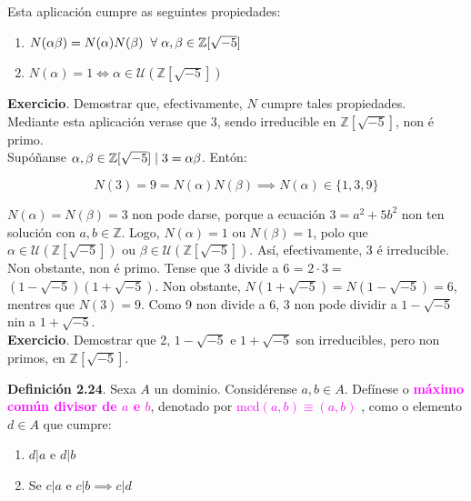 \documentclass[twoside]{report}
\newcommand{\magbf}[1]{\textcolor{magenta}{\textbf{#1}}} %
\newcommand{\magen}[1]{\textcolor{magenta}{#1}}
\theoremstyle{mystyle}
\begin{document}
\noindent Esta aplicación cumpre as seguintes propiedades:

\begin{enumerate}
    \item $N(\alpha\beta) = N(\alpha)N(\beta) \hspace{2mm} \forall \hspace{1mm} \alpha, \beta \in \mathbb{Z}[\sqrt{-5}]$
    \item $N(\alpha) = 1 \Longleftrightarrow \alpha \in \mathcal{U}(\mathbb{Z}[\sqrt{-5}])$
\end{enumerate}

\noindent \textbf{Exercicio}. Demostrar que, efectivamente, $N$ cumpre tales propiedades.\\

\noindent Mediante esta aplicación verase que 3, sendo irreducible en $\mathbb{Z}[\sqrt{-5}]$, non é primo.\\

\noindent Supóñanse $\alpha, \beta \in \mathbb{Z}[\sqrt{-5}] \hspace{1mm} | \hspace{1mm} 3 = \alpha\beta$. Entón: 

$$N(3) = 9 = N(\alpha)N(\beta) \implies N(\alpha) \in \{1,3,9\}$$

\noindent $N(\alpha) = N(\beta) = 3$ non pode darse, porque a ecuación $3 = a^{2} + 5b^{2}$ non ten solución con $a,b \in \mathbb{Z}$. Logo, $N(\alpha) = 1$ ou $N(\beta) = 1$, polo que $\alpha \in \mathcal{U}(\mathbb{Z}[\sqrt{-5}])$ ou $\beta \in \mathcal{U}(\mathbb{Z}[\sqrt{-5}])$. Así, efectivamente, 3 é irreducible.\\

\noindent Non obstante, non é primo. Tense que 3 divide a 6 = $2 \cdot 3 =$ $(1 - \sqrt{-5})(1 + \sqrt{-5})$. Non obstante, $N(1 + \sqrt{-5}) = N(1 - \sqrt{-5}) = 6$, mentres que $N(3) = 9$. Como 9 non divide a 6, 3 non pode dividir a $1 - \sqrt{-5}$ nin a $1 + \sqrt{-5}$.\\

\noindent \textbf{Exercicio}. Demostrar que 2, $1-\sqrt{-5}$ e $1+\sqrt{-5}$ son irreducibles, pero non primos, en $\mathbb{Z}[\sqrt{-5}]$.\pagebreak

\noindent \textbf{Definición 2.24}. Sexa $A$ un dominio. Considérense $a,b \in A$. Defínese o \magbf{máximo común divisor de $a$ e $b$}, denotado por \magen{mcd$(a,b) \equiv (a,b)$ }, como o elemento $d \in A$ que cumpre:

\begin{enumerate}
    \item $d|a$ e $d|b$
    \item Se $c|a$ e $c|b \implies c|d$
\end{enumerate}
\end{document}

